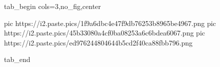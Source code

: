  
 
 
 
 


\ifcmt
  tab_begin cols=3,no_fig,center

     pic https://i2.paste.pics/1f9a6dbc4e47f9db76253b8965be4967.png
		 pic https://i2.paste.pics/45b33080a4cf0ba08253a6c6bdea6067.png
		 pic https://i2.paste.pics/ed976244804644b5cd2f40ca88fbb796.png 

  tab_end
\fi
